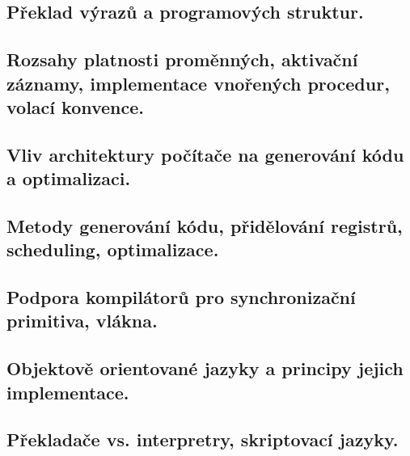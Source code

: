 \subsection{Překlad výrazů a programových struktur.}
\subsection{Rozsahy platnosti proměnných, aktivační záznamy, implementace vnořených procedur, volací konvence.}
\subsection{Vliv architektury počítače na generování kódu a optimalizaci.}
\subsection{Metody generování kódu, přidělování registrů, scheduling, optimalizace.}
\subsection{Podpora kompilátorů pro synchronizační primitiva, vlákna.}
\subsection{Objektově orientované jazyky a principy jejich implementace.}
\subsection{Překladače vs. interpretry, skriptovací jazyky.}
